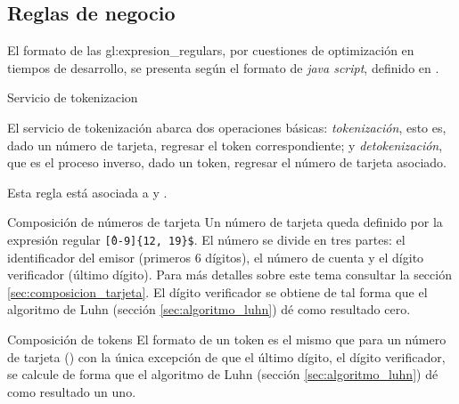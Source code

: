 %
%

\subsection{Reglas de negocio}

El formato de las \glspl{gl:expresion_regular}, por cuestiones de optimización
en tiempos de desarrollo, se presenta según el formato de \textit{java script},
definido en \cite{mozilla_er}.

{Servicio de tokenizacion}
{
  El servicio de tokenización abarca dos operaciones básicas:
  \textit{tokenización}, esto es, dado un número de tarjeta, regresar el token
  correspondiente; y \textit{detokenización}, que es el proceso inverso, dado un
  token, regresar el número de tarjeta asociado.

  Esta regla está asociada a  y
  .
}


{Composición de números de tarjeta}
{
  Un número de tarjeta queda definido por la expresión regular
  \texttt{\^[0-9]\{12, 19\}\$}. El número se divide en tres partes: el
  identificador del emisor (primeros 6 dígitos), el número de cuenta y el dígito
  verificador (último dígito). Para más detalles sobre este tema consultar la
  sección \ref{sec:composicion_tarjeta}. El dígito verificador se obtiene de tal
  forma que el algoritmo de Luhn (sección \ref{sec:algoritmo_luhn}) dé como
  resultado cero.
}

{Composición de tokens}
{
  El formato de un token es el mismo que para un número de tarjeta
  () con la única excepción de que el
  último dígito, el dígito verificador, se calcule de forma que el algoritmo de
  Luhn (sección \ref{sec:algoritmo_luhn}) dé como resultado un uno.
}


